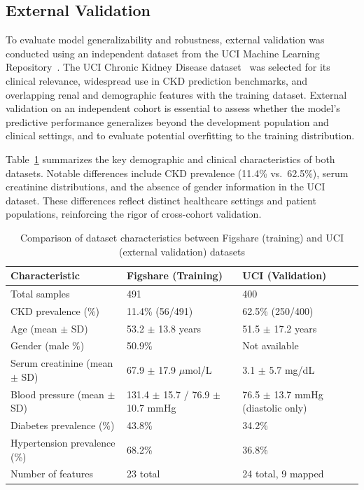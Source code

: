 \subsection{External Validation}
\label{sec:external_validation}

To evaluate model generalizability and robustness, external validation was conducted using an independent dataset from the UCI Machine Learning Repository~\cite{UCidataset}. The UCI Chronic Kidney Disease dataset~\cite{almustafa2018dataset} was selected for its clinical relevance, widespread use in CKD prediction benchmarks, and overlapping renal and demographic features with the training dataset. External validation on an independent cohort is essential to assess whether the model's predictive performance generalizes beyond the development population and clinical settings, and to evaluate potential overfitting to the training distribution.

Table~\ref{tab:dataset_comparison} summarizes the key demographic and clinical characteristics of both datasets. Notable differences include CKD prevalence (11.4\% vs.\ 62.5\%), serum creatinine distributions, and the absence of gender information in the UCI dataset. These differences reflect distinct healthcare settings and patient populations, reinforcing the rigor of cross-cohort validation.

\begin{table}[ht]
\centering
\caption{Comparison of dataset characteristics between Figshare (training) and UCI (external validation) datasets}
\label{tab:dataset_comparison}
\begin{tabular}{|p{4.5cm}|p{4.5cm}|p{4.5cm}|}
\hline
\textbf{Characteristic} & \textbf{Figshare (Training)} & \textbf{UCI (Validation)} \\ \hline
Total samples & 491 & 400 \\ \hline
CKD prevalence (\%) & 11.4\% (56/491) & 62.5\% (250/400) \\ \hline
Age (mean $\pm$ SD) & 53.2 $\pm$ 13.8 years & 51.5 $\pm$ 17.2 years \\ \hline
Gender (male \%) & 50.9\% & Not available \\ \hline
Serum creatinine (mean $\pm$ SD) & 67.9 $\pm$ 17.9 $\mu$mol/L & 3.1 $\pm$ 5.7 mg/dL \\ \hline
Blood pressure (mean $\pm$ SD) & 131.4 $\pm$ 15.7 / 76.9 $\pm$ 10.7 mmHg & 76.5 $\pm$ 13.7 mmHg (diastolic only) \\ \hline
Diabetes prevalence (\%) & 43.8\% & 34.2\% \\ \hline
Hypertension prevalence (\%) & 68.2\% & 36.8\% \\ \hline
Number of features & 23 total & 24 total, 9 mapped \\ \hline
\end{tabular}
\end{table}

